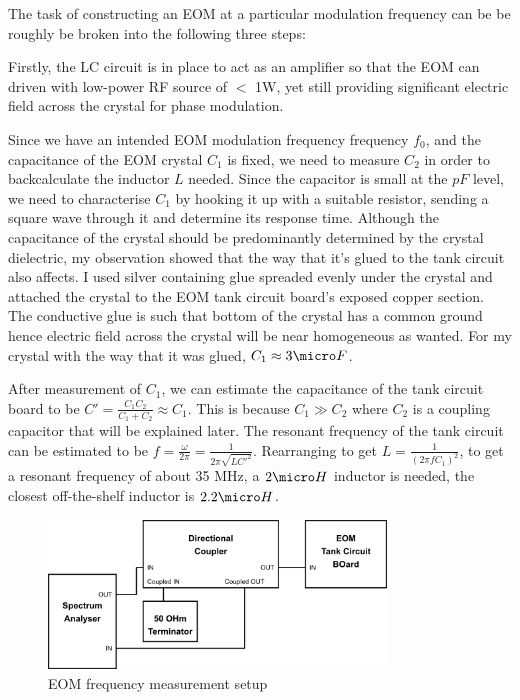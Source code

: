 \documentclass[11pt,A4Paper]{article}
\begin{document}
The task of constructing an EOM at a particular modulation frequency can be be roughly be broken into the following three steps:
\par
Firstly, the LC circuit is in place to act as an amplifier so that the EOM can driven with low-power RF source of $<$ 1W, yet still providing significant electric field across the crystal for phase modulation. 
\par
Since we have an intended EOM modulation frequency frequency $f_0$, and the capacitance of the EOM crystal $C_1$ is fixed, we need to measure $C_2$ in order to backcalculate the inductor $L$ needed. Since the capacitor is small at the $pF$ level, we need to characterise $C_1$ by hooking it up with a suitable resistor, sending a square wave through it and determine its response time. Although the capacitance of the crystal should be predominantly determined by the crystal dielectric, my observation showed that the way that it's glued to the tank circuit also affects. I used silver containing glue spreaded evenly under the crystal and attached the crystal to the EOM tank circuit board's exposed copper section. The conductive glue is such that bottom of the crystal has a common ground hence electric field across the crystal will be near homogeneous as wanted. For my crystal with the way that it was glued, $C_1 \approx 3 \micro F$.
\par
After measurement of $C_1$, we can estimate the capacitance of the tank circuit board to be $C' = \frac{C_1C_2}{C_1+C_2} \approx C_1$. This is because $C_1 \gg C_2$ where $C_2$ is a coupling capacitor that will be explained later. The resonant frequency of the tank circuit can be estimated to be $f = \frac{\omega}{2\pi} = \frac{1}{2\pi\sqrt{LC'^2}}$. Rearranging to get $L = \frac{1}{(2\pi f C_1)^2}$, to get a resonant frequency of about 35 MHz, a $2 \micro H$ inductor is needed, the closest off-the-shelf inductor is $2.2 \micro H$. 

\begin{figure}[H]
    \centering
    \includegraphics[width=0.8\textwidth]{eom-freq-measurement-setup.png}
    \caption{EOM frequency measurement setup}
    \label{fig:eom-freq-measurement-setup.png}
\end{figure}
\end{document}
